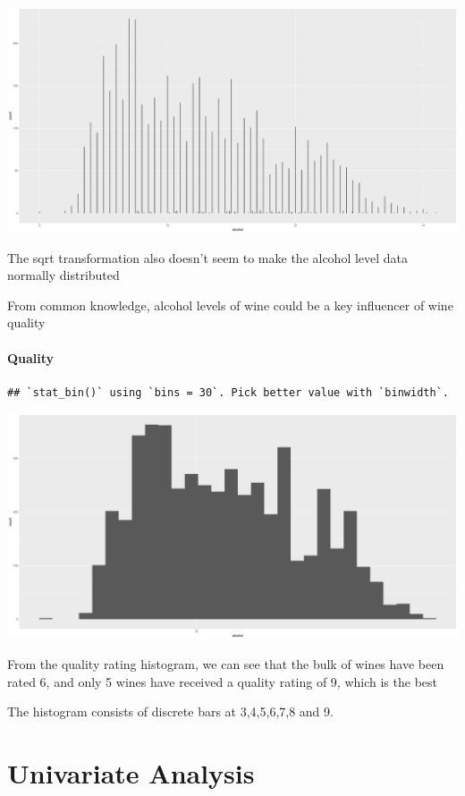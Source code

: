\documentclass[]{article}
\let\oldparagraph\paragraph
\renewcommand{\paragraph}[1]{\oldparagraph{#1}\mbox{}}
\begin{document}
\includegraphics{White_wine_quality_files/figure-latex/unnamed-chunk-22-1.pdf}

The sqrt transformation also doesn't seem to make the alcohol level data
normally distributed

From common knowledge, alcohol levels of wine could be a key influencer
of wine quality

\paragraph{Quality}\label{quality}

\begin{verbatim}
## `stat_bin()` using `bins = 30`. Pick better value with `binwidth`.
\end{verbatim}

\includegraphics{White_wine_quality_files/figure-latex/unnamed-chunk-23-1.pdf}

From the quality rating histogram, we can see that the bulk of wines
have been rated 6, and only 5 wines have received a quality rating of 9,
which is the best

The histogram consists of discrete bars at 3,4,5,6,7,8 and 9.

\section{Univariate Analysis}\label{univariate-analysis}
\end{document}
